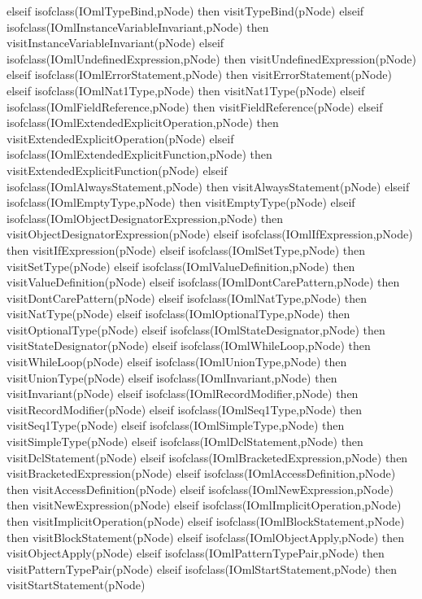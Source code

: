 \begin{vdm_al}
      elseif isofclass(IOmlTypeBind,pNode) then visitTypeBind(pNode)
      elseif isofclass(IOmlInstanceVariableInvariant,pNode) then visitInstanceVariableInvariant(pNode)
      elseif isofclass(IOmlUndefinedExpression,pNode) then visitUndefinedExpression(pNode)
      elseif isofclass(IOmlErrorStatement,pNode) then visitErrorStatement(pNode)
      elseif isofclass(IOmlNat1Type,pNode) then visitNat1Type(pNode)
      elseif isofclass(IOmlFieldReference,pNode) then visitFieldReference(pNode)
      elseif isofclass(IOmlExtendedExplicitOperation,pNode) then visitExtendedExplicitOperation(pNode)
      elseif isofclass(IOmlExtendedExplicitFunction,pNode) then visitExtendedExplicitFunction(pNode)
      elseif isofclass(IOmlAlwaysStatement,pNode) then visitAlwaysStatement(pNode)
      elseif isofclass(IOmlEmptyType,pNode) then visitEmptyType(pNode)
      elseif isofclass(IOmlObjectDesignatorExpression,pNode) then visitObjectDesignatorExpression(pNode)
      elseif isofclass(IOmlIfExpression,pNode) then visitIfExpression(pNode)
      elseif isofclass(IOmlSetType,pNode) then visitSetType(pNode)
      elseif isofclass(IOmlValueDefinition,pNode) then visitValueDefinition(pNode)
      elseif isofclass(IOmlDontCarePattern,pNode) then visitDontCarePattern(pNode)
      elseif isofclass(IOmlNatType,pNode) then visitNatType(pNode)
      elseif isofclass(IOmlOptionalType,pNode) then visitOptionalType(pNode)
      elseif isofclass(IOmlStateDesignator,pNode) then visitStateDesignator(pNode)
      elseif isofclass(IOmlWhileLoop,pNode) then visitWhileLoop(pNode)
      elseif isofclass(IOmlUnionType,pNode) then visitUnionType(pNode)
      elseif isofclass(IOmlInvariant,pNode) then visitInvariant(pNode)
      elseif isofclass(IOmlRecordModifier,pNode) then visitRecordModifier(pNode)
      elseif isofclass(IOmlSeq1Type,pNode) then visitSeq1Type(pNode)
      elseif isofclass(IOmlSimpleType,pNode) then visitSimpleType(pNode)
      elseif isofclass(IOmlDclStatement,pNode) then visitDclStatement(pNode)
      elseif isofclass(IOmlBracketedExpression,pNode) then visitBracketedExpression(pNode)
      elseif isofclass(IOmlAccessDefinition,pNode) then visitAccessDefinition(pNode)
      elseif isofclass(IOmlNewExpression,pNode) then visitNewExpression(pNode)
      elseif isofclass(IOmlImplicitOperation,pNode) then visitImplicitOperation(pNode)
      elseif isofclass(IOmlBlockStatement,pNode) then visitBlockStatement(pNode)
      elseif isofclass(IOmlObjectApply,pNode) then visitObjectApply(pNode)
      elseif isofclass(IOmlPatternTypePair,pNode) then visitPatternTypePair(pNode)
      elseif isofclass(IOmlStartStatement,pNode) then visitStartStatement(pNode)

\end{vdm_al}

